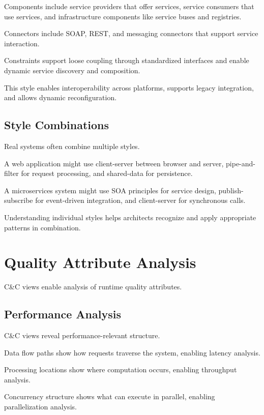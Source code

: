 \documentclass[11pt]{article}
\begin{document}
Components include service providers that offer services, service consumers that use services, and infrastructure components like service buses and registries.

Connectors include SOAP, REST, and messaging connectors that support service interaction.

Constraints support loose coupling through standardized interfaces and enable dynamic service discovery and composition.

This style enables interoperability across platforms, supports legacy integration, and allows dynamic reconfiguration.

\subsection{Style Combinations}

Real systems often combine multiple styles.

A web application might use client-server between browser and server, pipe-and-filter for request processing, and shared-data for persistence.

A microservices system might use SOA principles for service design, publish-subscribe for event-driven integration, and client-server for synchronous calls.

Understanding individual styles helps architects recognize and apply appropriate patterns in combination.

\section{Quality Attribute Analysis}

C\&C views enable analysis of runtime quality attributes.

\subsection{Performance Analysis}

C\&C views reveal performance-relevant structure.

Data flow paths show how requests traverse the system, enabling latency analysis.

Processing locations show where computation occurs, enabling throughput analysis.

Concurrency structure shows what can execute in parallel, enabling parallelization analysis.
\end{document}
